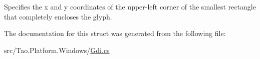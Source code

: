 Specifies the x and y coordinates of the upper-\/left corner of the smallest rectangle that completely encloses the glyph. 



The documentation for this struct was generated from the following file:\begin{DoxyCompactItemize}
\item 
src/Tao.Platform.Windows/\hyperlink{_gdi_8cs}{Gdi.cs}\end{DoxyCompactItemize}
